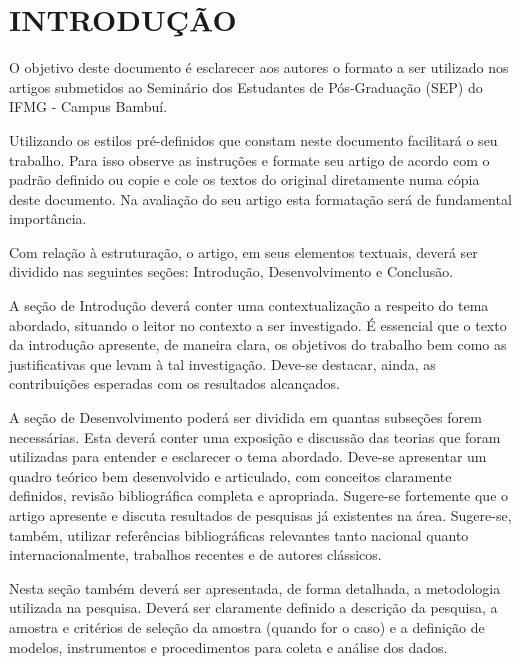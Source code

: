 \documentclass{sep}
\begin{document}
\linenumbers

\maketitle

\section{INTRODUÇÃO}

O objetivo deste documento é esclarecer aos autores o formato a ser utilizado nos artigos submetidos ao Seminário dos Estudantes de Pós-Graduação (SEP) do IFMG - Campus Bambuí.

Utilizando os estilos pré-definidos que constam neste documento facilitará o seu trabalho.
Para isso observe as instruções e formate seu artigo de acordo com o padrão definido ou copie e cole os textos do original diretamente numa cópia deste documento.
Na avaliação do seu artigo esta formatação será de fundamental importância.

Com relação à estruturação, o artigo, em seus elementos textuais, deverá ser dividido nas seguintes seções: Introdução, Desenvolvimento e Conclusão.

A seção de Introdução deverá conter uma contextualização a respeito do tema abordado, situando o leitor no contexto a ser investigado.
É essencial que o texto da introdução apresente, de maneira clara, os objetivos do trabalho bem como as justificativas que levam à tal investigação.
Deve-se destacar, ainda, as contribuições esperadas com os resultados alcançados.

A seção de Desenvolvimento poderá ser dividida em quantas subseções forem necessárias.
Esta deverá conter uma exposição e discussão das teorias que foram utilizadas para entender e esclarecer o tema abordado.
Deve-se apresentar um quadro teórico bem desenvolvido e articulado, com conceitos claramente definidos, revisão bibliográfica completa e apropriada.
Sugere-se fortemente que o artigo apresente e discuta resultados de pesquisas já existentes na área.
Sugere-se, também, utilizar referências bibliográficas relevantes tanto nacional quanto internacionalmente, trabalhos recentes e de autores clássicos.

Nesta seção também deverá ser apresentada, de forma detalhada, a metodologia utilizada na pesquisa.
Deverá ser claramente definido a descrição da pesquisa, a amostra e critérios de seleção da amostra (quando for o caso) e a definição de modelos, instrumentos e procedimentos para coleta e análise dos dados.
\end{document}

